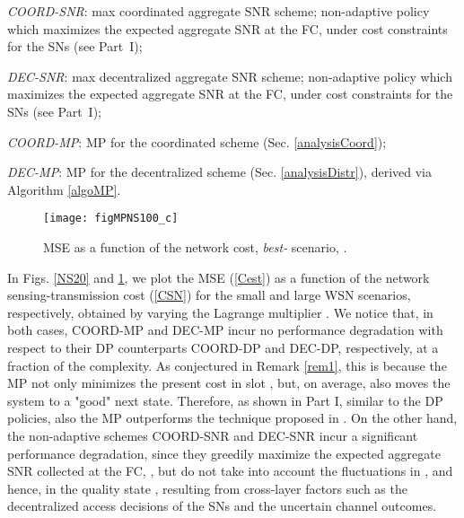 \documentclass[10pt,twocolumn,twoside]{IEEEtran}
\theoremstyle{plain}
\begin{document}
\noindent
 \emph{COORD-SNR}: max coordinated aggregate SNR scheme; non-adaptive policy which maximizes the expected aggregate SNR at the FC, under cost constraints for the SNs (see Part~I);

\noindent
 \emph{DEC-SNR}: max decentralized aggregate SNR scheme; non-adaptive policy which maximizes the expected aggregate SNR at the FC, under cost constraints for the SNs (see Part~I);

\noindent \emph{COORD-MP}: MP for the coordinated scheme (Sec. \ref{analysisCoord});
 
 \noindent  \emph{DEC-MP}: MP for the decentralized scheme (Sec. \ref{analysisDistr}), derived via Algorithm \ref{algoMP}.


\begin{figure}[t]
\centering
\texttt{[image: figMPNS100\_c]}
\vspace{-3mm}
\caption{MSE as a function of the network cost, \emph{best-} scenario, .}\vspace{-5mm}
\label{NS100}
\end{figure}



In Figs. \ref{NS20} and  \ref{NS100}, we plot the
 MSE (\ref{Cest}) as a function of the network sensing-transmission cost  (\ref{CSN})
 for the small and large WSN scenarios, respectively,  obtained by varying the Lagrange multiplier .
We notice that, in both cases, COORD-MP and DEC-MP incur no performance degradation with respect to
their DP counterparts COORD-DP and DEC-DP, respectively, at a fraction of the complexity.
As conjectured in Remark \ref{rem1}, this is because the MP not only minimizes the present cost in slot ,
but, on average,  also moves  the system to a "good" next state.
{Therefore, as shown in Part I, similar to the DP policies, also the MP outperforms the technique proposed in \cite{Msechu}.}
On the other hand, the non-adaptive schemes  COORD-SNR and DEC-SNR incur a significant performance degradation,
since they greedily maximize the expected aggregate SNR collected at the FC, , but do not take into account 
the fluctuations in , and hence, 
 in the
quality state , resulting from cross-layer factors such as the decentralized access decisions of the SNs and the uncertain channel outcomes.
\end{document}
